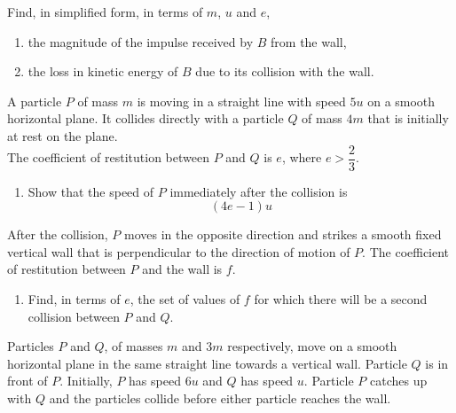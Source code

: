 \documentclass[leqno]{article}
\begin{document}
\begin{enumerate}[
  label=\textbf{\arabic*.},
  leftmargin=*,
  topsep=0pt,
  partopsep=0pt,
  parsep=0pt
]
Find, in simplified form, in terms of $m$, $u$ and $e$, \\
\begin{enumerate}[label=\textbf{(\alph*)}, resume]
  \item the magnitude of the impulse received by $B$ from the wall,  \\
  \item the loss in kinetic energy of $B$ due to its collision with the wall.  \\
\end{enumerate}

\newpage

\questionitem

A particle $P$ of mass $m$ is moving in a straight line with speed $5u$ on a smooth horizontal plane. It collides directly with a particle $Q$ of mass $4m$ that is initially at rest on the plane. \\

The coefficient of restitution between $P$ and $Q$ is $e$, where $e>\dfrac{2}{3}$. \\

\begin{enumerate}[label=\textbf{(\alph*)}]
  \item Show that the speed of $P$ immediately after the collision is
  \[
  (4e-1)u
  \]
\end{enumerate}
After the collision, $P$ moves in the opposite direction and strikes a smooth fixed vertical wall that is perpendicular to the direction of motion of $P$. The coefficient of restitution between $P$ and the wall is $f$. \\

\begin{enumerate}[label=\textbf{(\alph*)}, resume]
  \item Find, in terms of $e$, the set of values of $f$ for which there will be a second collision between $P$ and $Q$.  \\
\end{enumerate}

\newpage

\questionitem

Particles $P$ and $Q$, of masses $m$ and $3m$ respectively, move on a smooth horizontal plane in the same straight line towards a vertical wall. Particle $Q$ is in front of $P$. Initially, $P$ has speed $6u$ and $Q$ has speed $u$. Particle $P$ catches up with $Q$ and the particles collide before either particle reaches the wall. \\


\end{enumerate}
\end{document}
